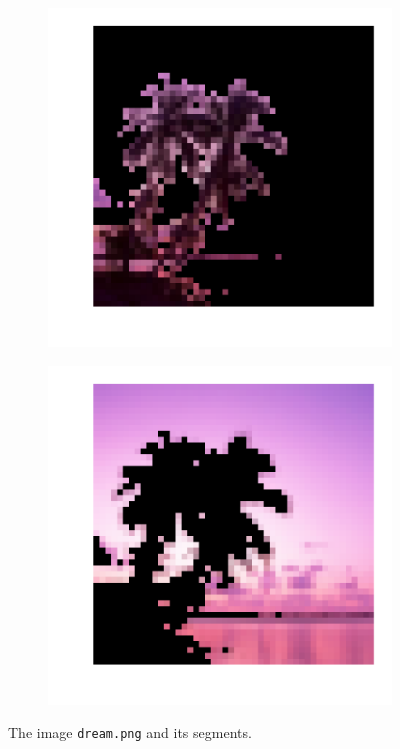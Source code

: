 \begin{figure}[H]
\begin{subfigure}{.32\textwidth}
        \includegraphics[width=\textwidth]{figures/dream_pos.pdf}
    \end{subfigure}
    \begin{subfigure}{.32\textwidth}
        \includegraphics[width=\textwidth]{figures/dream_neg.pdf}
    \end{subfigure}
\caption{The image \texttt{dream.png} and its segments.}
\label{fig:imgseg-segmentation-example}
\end{figure}

